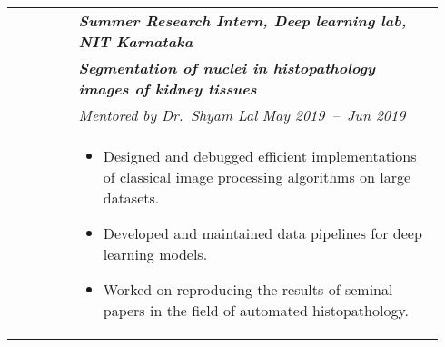 \documentclass[letterpaper, 10pt, oneside]{article}
\newcommand{\bdit}[1]{\textit{\textbf{#1}}}
\begin{document}
\begin{longtable}{@{} p{0.14\linewidth} p{0.8\linewidth}}
                    & \bdit{Summer Research Intern, Deep learning lab, NIT Karnataka} \\
                    & \bdit{Segmentation of nuclei in histopathology images of kidney tissues} \\
                    & \textit{Mentored by Dr.\ Shyam Lal} \hfill \hspace{-3em} \textit{May 2019\ --\ Jun 2019} \\
                    & \parbox{0.8\textwidth}{%
                        \begin{itemize}[leftmargin=*, itemsep=-0.88ex, topsep=-0.88ex]
                            \item Designed and debugged efficient implementations of classical image processing algorithms on large datasets.
                            \item Developed and maintained data pipelines for deep learning models.
                            \item Worked on reproducing the results of seminal papers in the field of automated histopathology.
                        \end{itemize}
                    } 
\\
\\


\end{longtable}
\end{document}
